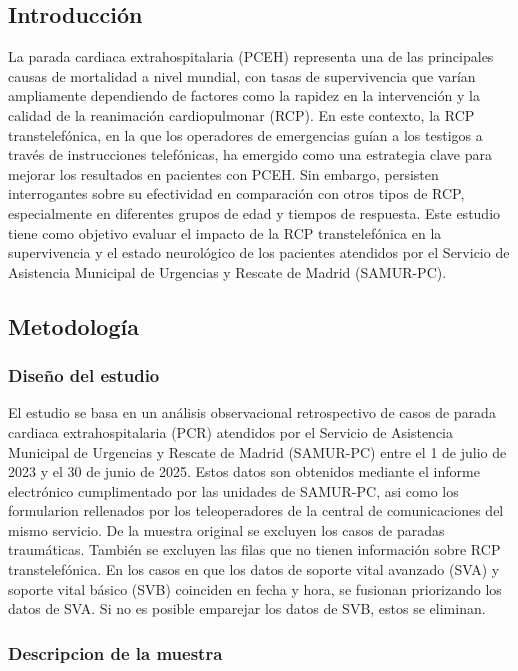 \documentclass[10pt,a4paper]{article}
\begin{document}
\begin{multicols}{2}

\subsection*{Introducción}

La parada cardiaca extrahospitalaria (PCEH) representa una de las principales causas de mortalidad a nivel mundial, con tasas de supervivencia que varían ampliamente dependiendo de factores como la rapidez en la intervención y la calidad de la reanimación cardiopulmonar (RCP). En este contexto, la RCP transtelefónica, en la que los operadores de emergencias guían a los testigos a través de instrucciones telefónicas, ha emergido como una estrategia clave para mejorar los resultados en pacientes con PCEH. Sin embargo, persisten interrogantes sobre su efectividad en comparación con otros tipos de RCP, especialmente en diferentes grupos de edad y tiempos de respuesta. Este estudio tiene como objetivo evaluar el impacto de la RCP transtelefónica en la supervivencia y el estado neurológico de los pacientes atendidos por el Servicio de Asistencia Municipal de Urgencias y Rescate de Madrid (SAMUR-PC).


\subsection*{Metodología}

\subsubsection*{Diseño del estudio}
El estudio se basa en un análisis observacional retrospectivo de casos de parada cardiaca extrahospitalaria (PCR) atendidos por el Servicio de Asistencia Municipal de Urgencias y Rescate de Madrid (SAMUR-PC) entre el 1 de julio de 2023 y el 30 de junio de 2025. Estos datos son obtenidos mediante el informe electrónico cumplimentado por las unidades de SAMUR-PC, asi como los formularion rellenados por los teleoperadores de la central de comunicaciones del mismo servicio.
De la muestra original se excluyen los casos de paradas traumáticas. También se excluyen las filas que no tienen información sobre RCP transtelefónica. En los casos en que los datos de soporte vital avanzado (SVA) y soporte vital básico (SVB) coinciden en fecha y hora, se fusionan priorizando los datos de SVA. Si no es posible emparejar los datos de SVB, estos se eliminan. 

\subsubsection*{Descripcion de la muestra}



\end{multicols}
\end{document}
